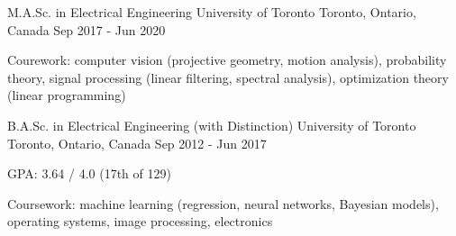 

\begin{cventries}

	\cventry
		{M.A.Sc. in Electrical Engineering} %
    {University of Toronto} %
    {Toronto, Ontario, Canada} %
    {Sep 2017 - Jun 2020} %
    {
				\item{Courework: computer vision (projective geometry, motion analysis), probability theory, signal processing (linear filtering, spectral analysis), optimization theory (linear programming)}
		}

  \cventry
    {B.A.Sc. in Electrical Engineering (with Distinction)} %
    {University of Toronto} %
    {Toronto, Ontario, Canada} %
    {Sep 2012 - Jun 2017} %
    {
      \begin{cvitems} %
				\item{GPA: 3.64 / 4.0 (17th of 129)}
				\item{Coursework: machine learning (regression, neural networks, Bayesian models), operating systems, image processing, electronics}
			\end{cvitems}
    }

\end{cventries}
